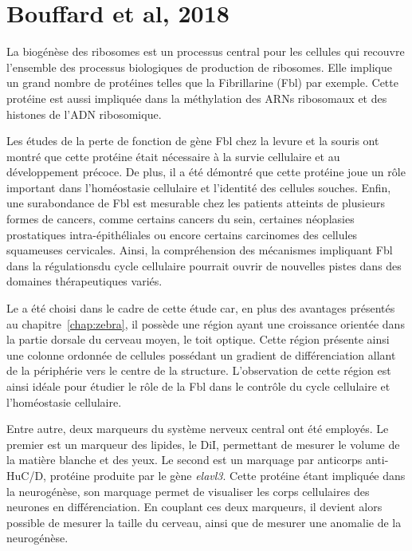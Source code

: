 \documentclass[\main/main.tex]{subfiles}
\begin{document}
\section{Bouffard et al, 2018}

\label{sec:bouffard}

%
La biogénèse des ribosomes est un processus central pour les cellules qui recouvre l'ensemble des processus biologiques de production de ribosomes.
%
Elle implique un grand nombre de protéines telles que la Fibrillarine (Fbl) par exemple.
%
Cette protéine est aussi impliquée dans la méthylation des ARNs ribosomaux et des histones de l'ADN ribosomique.

%
Les études de la perte de fonction de gène Fbl chez la levure et la souris ont montré que
cette protéine était nécessaire à la survie cellulaire et au développement précoce.
%
De plus, il a été démontré que cette protéine joue un rôle important dans l'homéostasie cellulaire et l'identité des cellules souches.
%
Enfin, une surabondance de Fbl est mesurable chez les patients atteints de plusieurs formes de cancers, comme certains cancers du sein, certaines néoplasies prostatiques intra-épithéliales ou encore certains carcinomes des cellules squameuses cervicales.
%
Ainsi, la compréhension des mécanismes impliquant Fbl dans la régulationsdu cycle cellulaire pourrait ouvrir de nouvelles pistes dans des domaines thérapeutiques variés.

%
Le \pz{} a été choisi dans le cadre de cette étude car,
en plus des avantages présentés au chapitre~\ref{chap:zebra},
il possède une région ayant une croissance orientée dans la partie dorsale du cerveau moyen, le toit optique.
%
Cette région présente ainsi une colonne ordonnée de cellules possédant
un gradient de différenciation allant de la périphérie vers le centre de la structure.
%
L'observation de cette région est ainsi idéale pour étudier le rôle de la Fbl
dans le contrôle du cycle cellulaire et l'homéostasie cellulaire.
%

%
Entre autre, deux marqueurs du système nerveux central ont été employés.
%
Le premier est un marqueur des lipides, le DiI, permettant de mesurer le volume de la matière blanche et des yeux.
%
Le second est un marquage par anticorps anti-HuC/D, protéine produite par le gène \textit{elavl3}.
%
Cette protéine étant impliquée dans la neurogénèse, son marquage permet de visualiser les corps cellulaires des neurones en différenciation.
%
En couplant ces deux marqueurs, il devient alors possible de mesurer la taille du cerveau, ainsi que de mesurer une anomalie de la neurogénèse.
\end{document}
